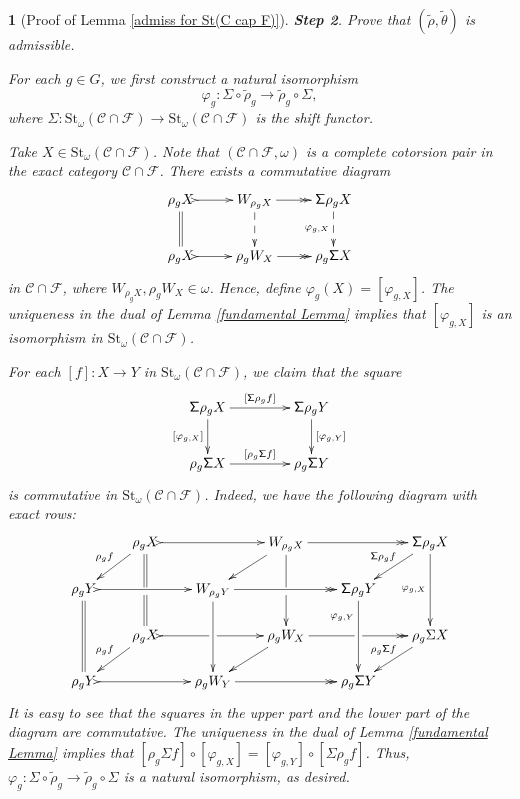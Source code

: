 \documentclass[12pt,twoside]{amsart}
\theoremstyle{bfupright head,slanted body}
\theoremstyle{bfupright head,upright body}
\newtheorem{bfhpg}[res]{}               \newtheorem*{bfhpg*}{}
\theoremstyle{fixed bf head,slanted body}
\theoremstyle{fixed bf head,upright body}
\theoremstyle{numbered paragraph}
\numberwithin{equation}{res}
\newcommand{\calC}{\mathcal{C}}
\newcommand{\calF}{\mathcal{F}}
\newcommand{\St}{\mathrm{St}}
\begin{document}
\begin{bfhpg}[Proof of Lemma \ref{admiss for St(C cap F)}]
\vspace{1ex}\textbf{Step 2}. Prove that $(\widetilde{\rho}, \widetilde{\theta})$ is admissible.

For each $g \in G$, we first construct a natural isomorphism
\[
\varphi_g: \mathsf{\Sigma} \circ \widetilde{\rho}_g \to \widetilde{\rho}_g \circ \mathsf{\Sigma},
\]
where $\mathsf{\Sigma}: \St_\omega(\calC \cap \calF) \to \St_\omega(\calC \cap \calF)$ is the shift functor.

Take $X \in \St_\omega(\calC \cap \calF)$.
Note that $(\calC \cap \calF, \omega)$ is a complete cotorsion pair in the exact category $\calC \cap \calF$.
There exists a commutative diagram
\[
\xymatrix{
   \rho_g X
\ar@{=}[d]
\ar@{>->}[r]
&  W_{\rho_g X}
\ar@{-->}[d]
\ar@{->>}[r]
&  \mathsf{\Sigma} \rho_g X
\ar@{-->}[d]_-{ \varphi_{g, X}} \\
   \rho_g X
\ar@{>->}[r]
&  \rho_g W_X
\ar@{->>}[r]
&  \rho_g \mathsf{\Sigma} X                               }
\]
in $\calC \cap \calF$, where $W_{\rho_g X}, \rho_g W_X \in \omega$.
Hence, define $\varphi_g(X) = [\varphi_{g, X}]$.
The uniqueness in the dual of Lemma \ref{fundamental Lemma} implies that $[\varphi_{g, X}]$ is an isomorphism in $\St_\omega(\calC \cap \calF)$.

For each $[f] : X \to Y$ in $\St_\omega(\calC \cap \calF)$, we claim that the square
\[
\xymatrix@C=1.5CM{
   \mathsf{\Sigma} \rho_g X
\ar[d]_-{[\varphi_{g, X}]}
\ar[r]^-{[\mathsf{\Sigma} \rho_g f]}
&  \mathsf{\Sigma} \rho_g Y
\ar[d]^-{[\varphi_{g, Y}]}           \\
   \rho_g \mathsf{\Sigma} X
\ar[r]^-{[\rho_g \mathsf{\Sigma} f]}
&  \rho_g \mathsf{\Sigma} Y                                      }
\]
is commutative in $\St_\omega(\calC \cap \calF)$.
Indeed, we have the following diagram with exact rows:
\[
\xymatrix@C=0.7CM @R=0.6CM{
&     \rho_g X         \ar@{>->}[rr]   \ar@{=}'[d][dd]      \ar[dl]_{\rho_g f }
&  &  W_{\rho_g X}     \ar@{->>}[rr]   \ar'[d][dd]          \ar[dl]
&  &  \mathsf{\Sigma} \rho_g X  \ar[dd]_{\varphi_{g,X}}              \ar[dl]_{\mathsf{\Sigma} \rho_g f}             \\
      \rho_g Y         \ar@{>->}[rr]   \ar@{=}[dd]
&  &  W_{\rho_g Y}     \ar@{->>}[rr]   \ar[dd]
&  &  \mathsf{\Sigma} \rho_g Y  \ar[dd]_(0.3){\varphi_{g,Y}}                                               \\
   &  \rho_g X         \ar@{>->}'[r][rr]                    \ar[dl]_{\rho_g f }
&  &  \rho_g W_X       \ar@{->>}'[r][rr]                    \ar[dl]
&  &  \rho_g \Sigma X                                       \ar[dl]_{\rho_g \mathsf{\Sigma} f}   \\
      \rho_g Y         \ar@{>->}[rr]
&  &  \rho_g W_Y       \ar@{->>}[rr]
&  &  \rho_g \mathsf{\Sigma} Y                     }
\]
It is easy to see that the squares in the upper part and the lower part of the diagram are commutative.
The uniqueness in the dual of Lemma \ref{fundamental Lemma} implies that $[\rho_g \mathsf{\Sigma} f] \circ [\varphi_{g,X}] = [\varphi_{g,Y}] \circ [\mathsf{\Sigma} \rho_g f]$.
Thus, $\varphi_g : \mathsf{\Sigma} \circ \widetilde{\rho}_g \to \widetilde{\rho}_g \circ \mathsf{\Sigma}$ is a natural isomorphism, as desired.


\end{bfhpg}
\end{document}
